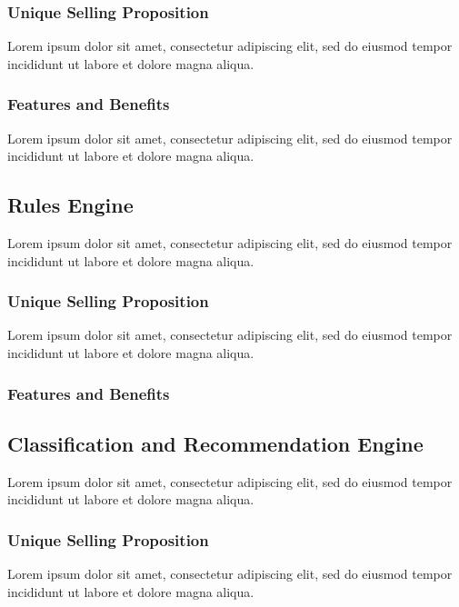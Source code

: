 \subsubsection*{Unique Selling Proposition}
Lorem ipsum dolor sit amet, consectetur adipiscing elit, sed do eiusmod tempor incididunt ut labore et dolore magna aliqua.

\subsubsection*{Features and Benefits}
Lorem ipsum dolor sit amet, consectetur adipiscing elit, sed do eiusmod tempor incididunt ut labore et dolore magna aliqua.


\subsection{Rules Engine}
Lorem ipsum dolor sit amet, consectetur adipiscing elit, sed do eiusmod tempor incididunt ut labore et dolore magna aliqua.

\subsubsection*{Unique Selling Proposition}

Lorem ipsum dolor sit amet, consectetur adipiscing elit, sed do eiusmod tempor incididunt ut labore et dolore magna aliqua.

\subsubsection*{Features and Benefits}


\subsection{Classification and Recommendation Engine}

Lorem ipsum dolor sit amet, consectetur adipiscing elit, sed do eiusmod tempor incididunt ut labore et dolore magna aliqua.

\subsubsection*{Unique Selling Proposition}

Lorem ipsum dolor sit amet, consectetur adipiscing elit, sed do eiusmod tempor incididunt ut labore et dolore magna aliqua.

